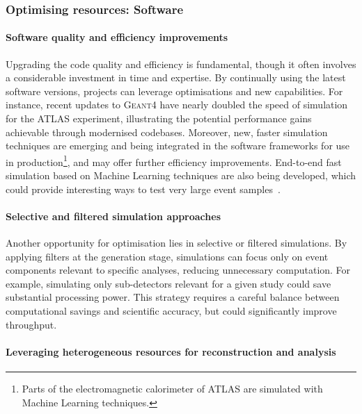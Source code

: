 \subsubsection{Optimising resources: Software}

\paragraph{Software quality and efficiency improvements}

Upgrading the code quality and efficiency is fundamental, though it often involves a considerable investment in time and expertise. 
By continually using the latest software versions, projects can leverage optimisations and new capabilities. 
For instance, recent updates to \textsc{Geant4} have nearly doubled the speed of simulation for the ATLAS experiment, 
illustrating the potential performance gains achievable through modernised codebases. 
Moreover, new, faster simulation techniques are emerging and being integrated in the software frameworks 
for use in production\footnote{Parts of the electromagnetic calorimeter of ATLAS are simulated with Machine Learning techniques.}, 
and may offer further efficiency improvements. 
End-to-end fast simulation based on Machine Learning techniques are also being developed, 
which could provide interesting ways to test very large event samples~\cite{flashsim-chep24}. 

\paragraph{Selective and filtered simulation approaches}

Another opportunity for optimisation lies in selective or filtered simulations. 
By applying filters at the generation stage, 
simulations can focus only on event components relevant to specific analyses, 
reducing unnecessary computation. 
For example, simulating only sub-detectors relevant for a given study could save substantial processing power. 
This strategy requires a careful balance between computational savings and scientific accuracy, but could significantly improve throughput.

\paragraph{Leveraging heterogeneous resources for reconstruction and analysis}

